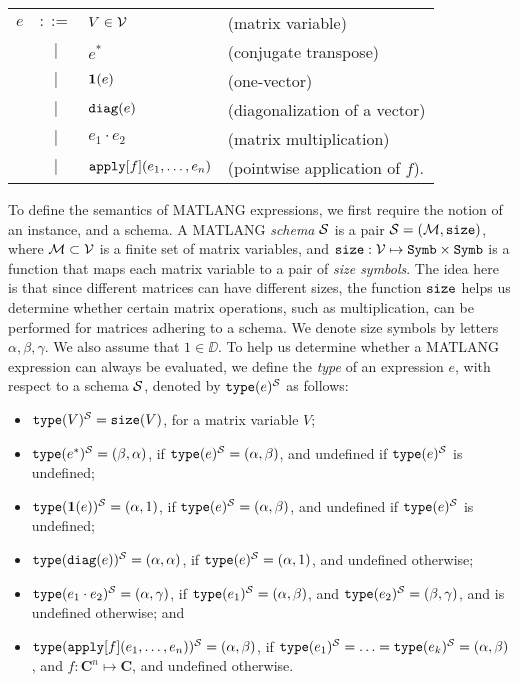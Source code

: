 \medskip

\begin{tabular}{lcll}
$e$ & $::=$ & $V\in \mathcal{V}$ & (matrix variable)\\
 & $|$ & $e^*$ & (conjugate transpose)\\ 
 & $|$ & $\mathbf{1}(e)$ & (one-vector)\\ 
 & $|$ & $\texttt{diag}(e)$ & (diagonalization of a vector)\\  
 & $|$ & $e_1 \cdot e_2$ & (matrix multiplication)\\   
 & $|$ & $\texttt{apply}[f](e_1,\ldots ,e_n)$ & (pointwise application of $f$).    
\end{tabular}

\medskip

To define the semantics of MATLANG expressions, we first require the notion of an instance, and a schema. A MATLANG {\em schema} $\mathcal{S}$ is a pair $\mathcal{S}=(\mathcal{M},\texttt{size})$, where $\mathcal{M}\subset \mathcal{V}$ is a finite set of matrix variables, and $\texttt{size}: \mathcal{V} \mapsto \texttt{Symb}\times \texttt{Symb}$ is a function that maps each matrix variable to a pair of {\em size symbols}. The idea here is that since different matrices can have different sizes, the function $\texttt{size}$ helps us determine whether certain matrix operations, such as multiplication, can be performed for matrices adhering to a schema. We denote size symbols by letters $\alpha,\beta,\gamma$. We also assume that $1\in \DD$. To help us determine whether a MATLANG expression can always be evaluated, we define the {\em type} of an expression $e$, with respect to a schema $\mathcal{S}$, denoted by $\texttt{type}(e)^{\mathcal{S}}$ as follows:
\begin{itemize}
\item $\texttt{type}(V)^{\mathcal{S}} = \texttt{size}(V)$, for a matrix variable $V$;
\item $\texttt{type}(e^*)^{\mathcal{S}} = (\beta,\alpha)$, if $\texttt{type}(e)^{\mathcal{S}}=(\alpha,\beta)$, and undefined if $\texttt{type}(e)^{\mathcal{S}}$ is undefined;
\item $\texttt{type}(\mathbf{1}(e))^{\mathcal{S}} = (\alpha,1)$, if $\texttt{type}(e)^{\mathcal{S}}=(\alpha,\beta)$, and undefined if $\texttt{type}(e)^{\mathcal{S}}$ is undefined;
\item $\texttt{type}(\texttt{diag}(e))^{\mathcal{S}} = (\alpha,\alpha)$, if $\texttt{type}(e)^{\mathcal{S}}=(\alpha,1)$, and undefined otherwise;
\item $\texttt{type}(e_1 \cdot e_2)^{\mathcal{S}} = (\alpha,\gamma)$, if $\texttt{type}(e_1)^{\mathcal{S}}=(\alpha,\beta)$, and $\texttt{type}(e_2)^{\mathcal{S}}=(\beta,\gamma)$, and is undefined otherwise; and
\item $\texttt{type}(\texttt{apply}[f](e_1,\ldots ,e_n))^{\mathcal{S}} = (\alpha,\beta)$, if $\texttt{type}(e_1)^{\mathcal{S}} = \ldots = \texttt{type}(e_k)^{\mathcal{S}} = (\alpha,\beta)$, and $f:\mathbf{C}^n \mapsto  \mathbf{C}$, and undefined otherwise.
\end{itemize}

